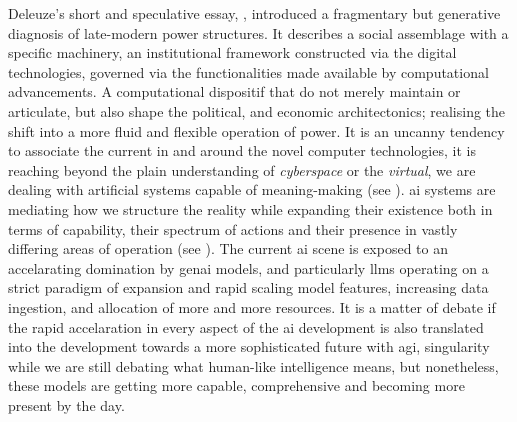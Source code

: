Deleuze's short and speculative essay,  \parencite*{deleuze1992a}, introduced a fragmentary but generative diagnosis of late-modern power structures. It describes a social assemblage with a specific machinery, an institutional framework constructed via the digital technologies, governed via the functionalities made available by computational advancements. A computational dispositif that do not merely maintain or articulate, but also shape the political, and economic architectonics; realising the shift into a more fluid and flexible operation of power. It is an uncanny tendency to associate the current in and around the novel computer technologies, it is reaching beyond the plain understanding of \textit{cyberspace} or the \textit{virtual}, we are dealing with artificial systems capable of meaning-making (see \cite[]{kazakov2025, dishon2024}). \Gls{ai} systems are mediating how we structure the reality while expanding their existence both in terms of capability, their spectrum of actions and their presence in vastly differing areas of operation (see \cite[]{kazakov2025}). The current \gls{ai} scene is exposed to an accelarating domination by \gls{genai} models, and particularly \glspl{llm} operating on a strict paradigm of expansion and rapid scaling model features, increasing data ingestion, and allocation of more and more resources. It is a matter of debate if the rapid accelaration in every aspect of the \gls{ai} development is also translated into the development towards a more sophisticated future with \gls{agi}, singularity while we are still debating what human-like intelligence means, but nonetheless, these models are getting more capable, comprehensive %
and becoming more present by the day.


